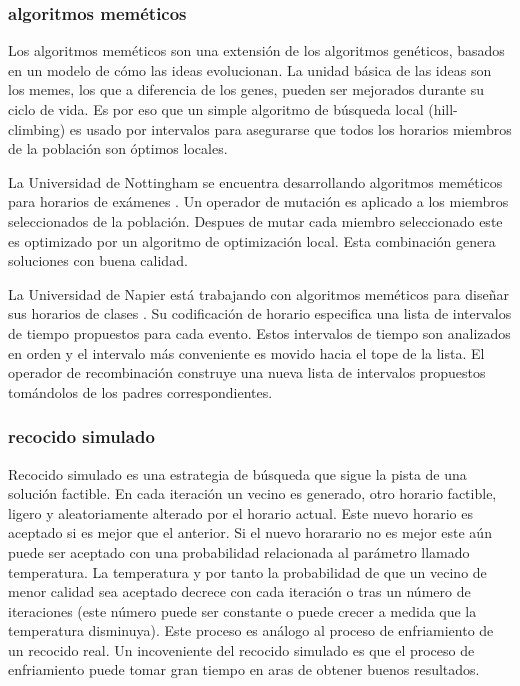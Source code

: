 \subsubsection{algoritmos mem\'eticos}

Los algoritmos mem\'eticos son una extensión de los algoritmos gen\'eticos, basados en un modelo de cómo las ideas evolucionan. La unidad básica de las ideas son los memes, los que a diferencia de los genes, pueden ser mejorados durante su ciclo de vida. Es por eso que un simple algoritmo de búsqueda local (hill-climbing) es usado por intervalos
para asegurarse que todos los horarios miembros de la población son óptimos locales.

La Universidad de Nottingham se encuentra desarrollando algoritmos mem\'eticos para horarios de exámenes \cite{EK Burke and JP Newall and RF Weare}. Un operador de mutación es aplicado a los miembros seleccionados de la población. Despues de mutar cada miembro seleccionado este es optimizado por un algoritmo de optimización local. Esta combinación genera soluciones con buena calidad.

La Universidad de Napier está trabajando con algoritmos mem\'eticos para diseñar sus horarios de clases \cite{B Paechter and A Cumming and MG Norman and H Luchian}. Su codificación de horario especifica una lista de intervalos de tiempo propuestos para cada evento. Estos intervalos de tiempo son analizados en orden y el intervalo más conveniente es movido hacia el tope de la lista. El operador de recombinación construye una nueva lista de intervalos propuestos tomándolos de los padres correspondientes.

\subsubsection{recocido simulado}

Recocido simulado es una estrategia de búsqueda que sigue la pista de una solución factible. En cada iteración un vecino es generado, otro horario factible, ligero y aleatoriamente alterado por el horario actual. Este nuevo horario es aceptado si es mejor que el anterior. Si el nuevo horarario no es mejor este aún puede ser aceptado con una probabilidad relacionada al parámetro llamado temperatura. La temperatura y por tanto la probabilidad de que un vecino de menor calidad sea aceptado decrece con cada iteración o tras un número de iteraciones (este número puede ser constante o puede crecer a medida que la temperatura disminuya). Este proceso es análogo al proceso de enfriamiento de un recocido real. Un incoveniente del recocido simulado es que el proceso de enfriamiento puede tomar gran tiempo en aras de obtener buenos resultados.

